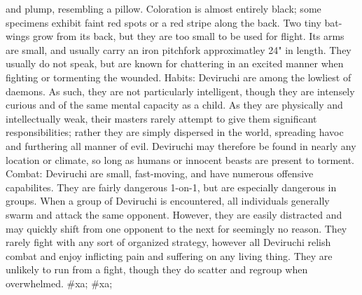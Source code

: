 \documentclass[twoside]{book}
\begin{document}
\begin{multicols}{2}
{           and plump, resembling a pillow. Coloration is almost entirely
           black; some specimens exhibit faint red spots or a red stripe
           along the back. Two tiny bat-wings grow from its back, but
           they are too small to be used for flight. Its arms are small,
           and usually carry an iron pitchfork approximatley 24" in
           length. They usually do not speak, but are known for
           chattering in an excited manner when fighting or tormenting
           the wounded. Habits: Deviruchi are among the lowliest of
           daemons. As such, they are not particularly intelligent,
           though they are intensely curious and of the same mental
           capacity as a child. As they are physically and intellectually
           weak, their masters rarely attempt to give them significant
           responsibilities; rather they are simply dispersed in the
           world, spreading havoc and furthering all manner of evil.
           Deviruchi may therefore be found in nearly any location or
           climate, so long as humans or innocent beasts are present to
           torment. Combat: Deviruchi are small, fast-moving, and have
           numerous offensive capabilites. They are fairly dangerous
           1-on-1, but are especially dangerous in groups. When a group
           of Deviruchi is encountered, all individuals generally swarm
           and attack the same opponent. However, they are easily
           distracted and may quickly shift from one opponent to the next
           for seemingly no reason. They rarely fight with any sort of
           organized strategy, however all Deviruchi relish combat and
           enjoy inflicting pain and suffering on any living thing. They
           are unlikely to run from a fight, though they do scatter and
           regroup when overwhelmed. }\vspace{1ex}
    \hspace{-2ex}
\#xa;
\#xa;
\end{multicols}
\end{document}
